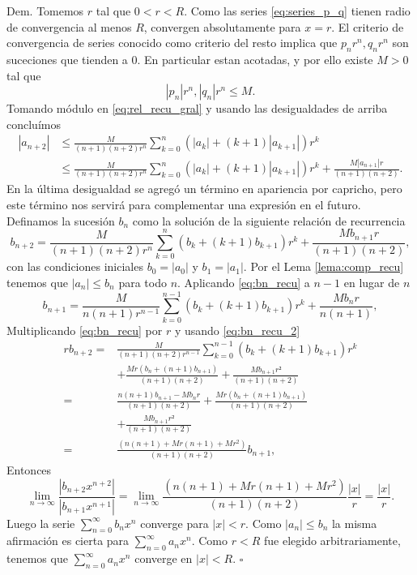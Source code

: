 \documentclass{article}
\newenvironment{demo}{\noindent\emph{Dem.}}{{\hspace*{\fill}$\square$} \newline\vspace{5pt}}
\newcounter{lem_cont}
\renewcommand{\emph}[1]{\textcolor[rgb]{0,0,1}{#1}}
\begin{document}
\begin{demo}
Tomemos $r$ tal que $0<r<R$. Como las series \eqref{eq:series_p_q} tienen radio de convergencia al menos  $R$,  convergen absolutamente para $x=r$. El criterio de convergencia de series conocido como criterio del resto implica que $p_nr^n,q_nr^n$ son suceciones que tienden a $0$. En particular estan acotadas, y por ello existe $M>0$ tal que
\[ |p_n|r^n,|q_n|r^n\leq M.\]
Tomando módulo en \eqref{eq:rel_recu_gral} y usando las desigualdades de arriba concluímos
\[
  \begin{split}
    |a_{n+2}|&\leq\frac{M}{(n+1)(n+2)r^n} \sum_{k=0}^n\left(|a_k|+ (k+1)|a_{k+1}|\right)r^k\\
&\leq\frac{M}{(n+1)(n+2)r^n} \sum_{k=0}^n\left(|a_k|+ (k+1)|a_{k+1}|\right)r^k+\frac{M|a_{n+1}|r}{(n+1)(n+2)}.
  \end{split}
  \]
En la última desigualdad se agregó un término en apariencia por capricho, pero este término nos servirá para complementar una expresión en el futuro. Definamos la sucesión $b_n$ como la solución de la siguiente relación de recurrencia
\begin{equation}\label{eq:bn_recu}b_{n+2}=\frac{M}{(n+1)(n+2)r^n} \sum_{k=0}^n\left(b_k+ (k+1)b_{k+1}\right)r^k+\frac{Mb_{n+1}r}{(n+1)(n+2)},
\end{equation}
con las condiciones iniciales $b_0=|a_0|$ y $b_1=|a_1|$. Por el Lema \ref{lema:comp_recu} tenemos que $|a_n|\leq b_n$ para todo $n$. Aplicando \eqref{eq:bn_recu} a $n-1$ en lugar de $n$
\begin{equation}\label{eq:bn_recu_2}b_{n+1}=\frac{M}{n(n+1)r^{n-1}} \sum_{k=0}^{n-1}\left(b_k+ (k+1)b_{k+1}\right)r^k+\frac{Mb_{n}r}{n(n+1)},
\end{equation}
Multiplicando  \eqref{eq:bn_recu} por $r$ y usando \ref{eq:bn_recu_2}
\[
\begin{split}
rb_{n+2}=&\frac{M}{(n+1)(n+2)r^{n-1}} \sum_{k=0}^{n-1}\left(b_k+ (k+1)b_{k+1}\right)r^k\\
&+\frac{Mr\left(b_n+ (n+1)b_{n+1}\right)}{(n+1)(n+2)}+\frac{Mb_{n+1}r²}{(n+1)(n+2)}\\
=&\frac{n(n+1)b_{n+1}-Mb_nr}{(n+1)(n+2)}
+\frac{Mr\left(b_n+ (n+1)b_{n+1}\right)}{(n+1)(n+2)}\\
&+\frac{Mb_{n+1}r²}{(n+1)(n+2)}\\
=&\frac{(n(n+1)+Mr(n+1)+Mr^2)}{(n+1)(n+2)}b_{n+1},
\end{split}
\]
Entonces 
\[\lim_{n\to\infty}\frac{|b_{n+2}x^{n+2}|}{|b_{n+1}x^{n+1}|}=\lim_{n\to\infty}\frac{(n(n+1)+Mr(n+1)+Mr^2)}{(n+1)(n+2)}\frac{|x|}{r}=\frac{|x|}{r}.
\]
Luego la serie $\sum_{n=0}^{\infty}b_nx^n$ converge para $|x|<r$. Como $|a_n|\leq b_n$ la misma afirmación es cierta para $\sum_{n=0}^{\infty}a_nx^n$. Como $r<R$ fue elegido arbitrariamente, tenemos que $\sum_{n=0}^{\infty}a_nx^n$ converge en $|x|<R$.
\end{demo}
\end{document}
